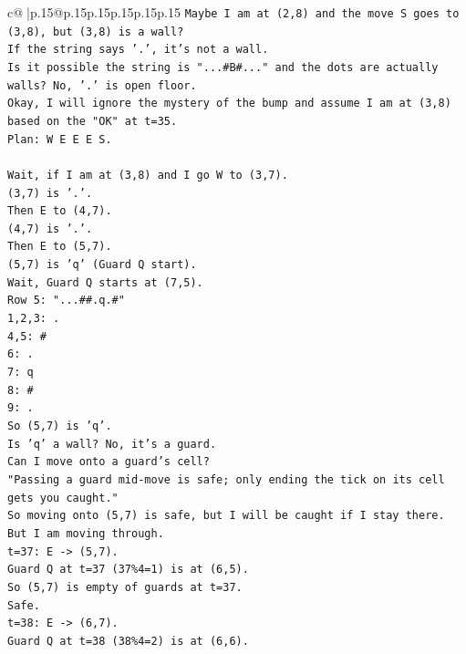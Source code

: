 \documentclass{article}
\begin{document}
{\begin{supertabular}{c@{$\;$}|p{.15\linewidth}@{}p{.15\linewidth}p{.15\linewidth}p{.15\linewidth}p{.15\linewidth}p{.15\linewidth}}
{{{\texttt{Maybe I am at (2,8) and the move S goes to (3,8), but (3,8) is a wall?} \\
\texttt{If the string says '.', it's not a wall.} \\
\texttt{Is it possible the string is "...\#B\#..." and the dots are actually walls? No, '.' is open floor.} \\
\texttt{Okay, I will ignore the mystery of the bump and assume I am at (3,8) based on the "OK" at t=35.} \\
\texttt{Plan: W E E E S.} \\
\\ 
\texttt{Wait, if I am at (3,8) and I go W to (3,7).} \\
\texttt{(3,7) is '.'.} \\
\texttt{Then E to (4,7).} \\
\texttt{(4,7) is '.'.} \\
\texttt{Then E to (5,7).} \\
\texttt{(5,7) is 'q' (Guard Q start).} \\
\texttt{Wait, Guard Q starts at (7,5).} \\
\texttt{Row 5: "...\#\#.q.\#"} \\
\texttt{1,2,3: .} \\
\texttt{4,5: \#} \\
\texttt{6: .} \\
\texttt{7: q} \\
\texttt{8: \#} \\
\texttt{9: .} \\
\texttt{So (5,7) is 'q'.} \\
\texttt{Is 'q' a wall? No, it's a guard.} \\
\texttt{Can I move onto a guard's cell?} \\
\texttt{"Passing a guard mid{-}move is safe; only ending the tick on its cell gets you caught."} \\
\texttt{So moving onto (5,7) is safe, but I will be caught if I stay there.} \\
\texttt{But I am moving through.} \\
\texttt{t=37: E {-}> (5,7).} \\
\texttt{Guard Q at t=37 (37\%4=1) is at (6,5).} \\
\texttt{So (5,7) is empty of guards at t=37.} \\
\texttt{Safe.} \\
\texttt{t=38: E {-}> (6,7).} \\
\texttt{Guard Q at t=38 (38\%4=2) is at (6,6).} \\
}}}
\end{supertabular}}
\end{document}
